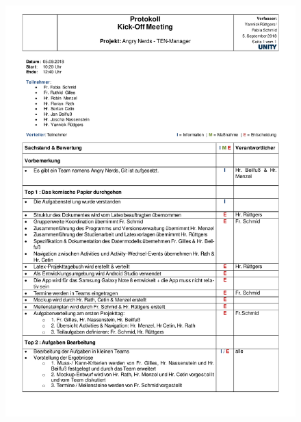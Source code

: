 \begin{figure}[H]
\centering
\begin{minipage}[t]{1\textwidth} %
\includegraphics[height=20.5cm]{img/Protokoll2018-09-05.pdf}\\ %
\end{minipage}
\end{figure}


